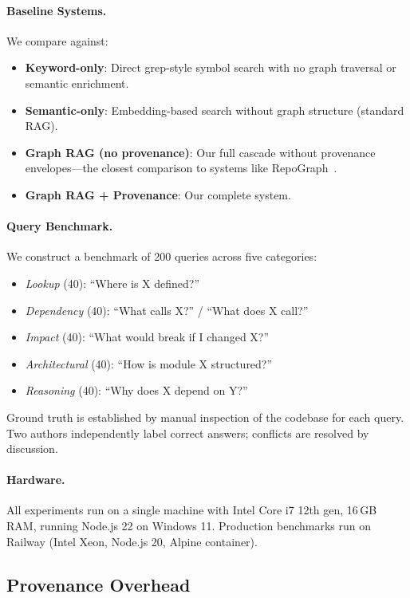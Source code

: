 \documentclass[conference]{IEEEtran}
\begin{document}
\paragraph{Baseline Systems.} We compare against:
\begin{itemize}
  \item \textbf{Keyword-only}: Direct grep-style symbol search with no
    graph traversal or semantic enrichment.
  \item \textbf{Semantic-only}: Embedding-based search without graph
    structure (standard RAG).
  \item \textbf{Graph RAG (no provenance)}: Our full cascade without
    provenance envelopes---the closest comparison to systems like
    RepoGraph~\cite{CodeGraph2025}.
  \item \textbf{Graph RAG + Provenance}: Our complete system.
\end{itemize}

\paragraph{Query Benchmark.} We construct a benchmark of
200 queries across five categories:
\begin{itemize}
  \item \emph{Lookup} (40): ``Where is X defined?''
  \item \emph{Dependency} (40): ``What calls X?'' / ``What does X call?''
  \item \emph{Impact} (40): ``What would break if I changed X?''
  \item \emph{Architectural} (40): ``How is module X structured?''
  \item \emph{Reasoning} (40): ``Why does X depend on Y?''
\end{itemize}

Ground truth is established by manual inspection of the codebase for
each query. Two authors independently label correct answers; conflicts
are resolved by discussion.

\paragraph{Hardware.} All experiments run on a single machine with
Intel Core i7 12th gen, 16\,GB RAM, running Node.js 22 on
Windows 11. Production benchmarks run on Railway (Intel Xeon, Node.js 20,
Alpine container).

\subsection{Provenance Overhead}
\label{sec:eval:overhead}
\end{document}

